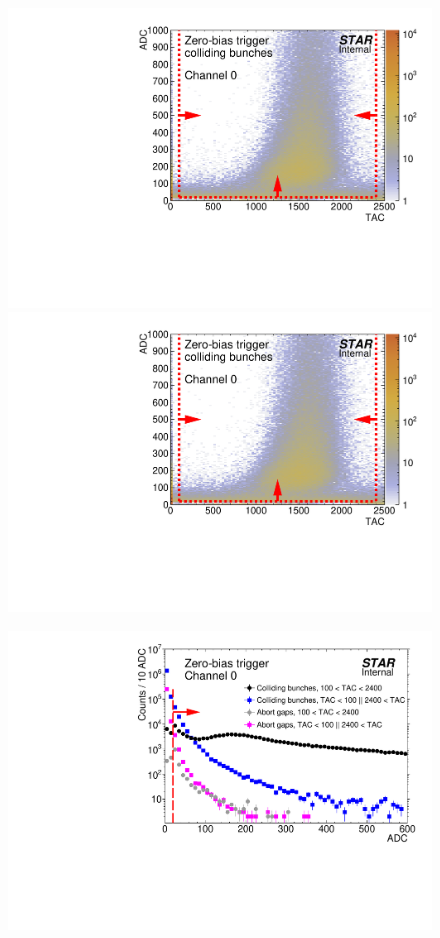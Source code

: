 \begin{figure}[hb]
{  \includegraphics[width=\linewidth,page=39]{graphics/eventSelection/bbc/Bbc_ADCvsTAC_collidingBunches.pdf}\\
  \includegraphics[width=\linewidth,page=40]{graphics/eventSelection/bbc/Bbc_ADCvsTAC_collidingBunches.pdf}
}%
\parbox{0.327\textwidth}{
  \centering
  \includegraphics[width=\linewidth,page=37]{graphics/eventSelection/bbc/Bbc_ADC.pdf}\\
}
\end{figure}
